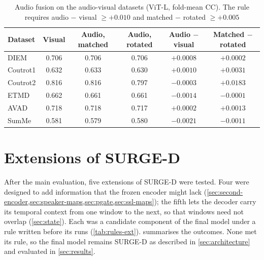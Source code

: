 \begin{table}[htbp]
  \centering
  \caption{Audio fusion on the audio-visual datasets (\acrshort{ViT}-L, fold-mean \acrshort{CC}). The
  rule requires audio $-$ visual $\geq+0.010$ and matched $-$ rotated
  $\geq+0.005$}\label{tab:audio}
  \footnotesize
  \setlength{\tabcolsep}{4pt}
  \begin{tabular}{@{}lccccc@{}}
    \toprule
    \textbf{Dataset} & \textbf{Visual} & \textbf{Audio, matched} & \textbf{Audio, rotated}
      & \textbf{Audio $-$ visual} & \textbf{Matched $-$ rotated} \\
    \midrule
    DIEM     & 0.706 & 0.706 & 0.706 & $+0.0008$ & $+0.0002$ \\
    Coutrot1 & 0.632 & 0.633 & 0.630 & $+0.0010$ & $+0.0031$ \\
    Coutrot2 & 0.816 & 0.816 & 0.797 & $-0.0003$ & $+0.0183$ \\
    ETMD     & 0.662 & 0.661 & 0.661 & $-0.0014$ & $-0.0001$ \\
    AVAD     & 0.718 & 0.718 & 0.717 & $+0.0002$ & $+0.0013$ \\
    SumMe    & 0.581 & 0.579 & 0.580 & $-0.0021$ & $-0.0011$ \\
    \bottomrule
  \end{tabular}
\end{table}

\section{Extensions of SURGE-D}\label{sec:extensions}

After the main evaluation, five extensions of SURGE-D were tested. Four were
designed to add information that the frozen encoder might lack
(\cref{sec:second-encoder,sec:speaker-maps,sec:pgate,sec:ssl-maps}); the fifth
lets the decoder carry its temporal context from one window to the next, so
that windows need not overlap (\cref{sec:state}). Each was
a candidate component of the final model under a rule written before its runs
(\cref{tab:rules-ext}).  summarises the outcomes. None met its
rule, so the final model remains SURGE-D as described in
\cref{sec:architecture} and evaluated in \cref{sec:results}.

